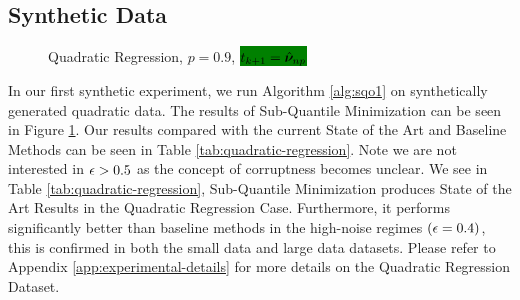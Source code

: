 \documentclass{article} %
\begin{document}
	\subsection{Synthetic Data}
	\begin{figure}[!h]
		\centering
		\label{fig:synthetic-quadratic}
		\caption{Quadratic Regression, $p = 0.9$, \colorbox{green}{$\displaystyle t_{k+1} = \hat{{\bm{\nu}}}_{np}$}}
	\end{figure}
	In our first synthetic experiment, we run Algorithm \ref{alg:sqo1} on synthetically generated quadratic data. The results of Sub-Quantile Minimization can be seen in Figure \ref{fig:synthetic-quadratic}. Our results compared with the current State of the Art and Baseline Methods can be seen in Table \ref{tab:quadratic-regression}. Note we are not interested in ${\epsilon} > 0.5$ as the concept of corruptness becomes unclear. We see in Table \ref{tab:quadratic-regression}, Sub-Quantile Minimization produces State of the Art Results in the Quadratic Regression Case. Furthermore, it performs significantly better than baseline methods in the high-noise regimes $({\epsilon} = 0.4)$, this is confirmed in both the small data and large data datasets. Please refer to Appendix \ref{app:experimental-details} for more details on the Quadratic Regression Dataset. 
	
\end{document}
